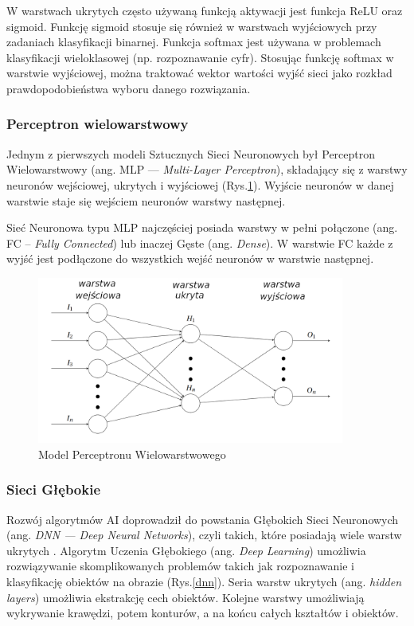 W warstwach ukrytych często używaną funkcją aktywacji jest funkcja ReLU oraz sigmoid. Funkcję sigmoid stosuje się również w warstwach wyjściowych przy zadaniach klasyfikacji binarnej. Funkcja softmax jest używana w problemach klasyfikacji wieloklasowej (np. rozpoznawanie cyfr). Stosując funkcję softmax w warstwie wyjściowej, można traktować wektor wartości wyjść sieci jako rozkład prawdopodobieństwa wyboru danego rozwiązania.

\subsubsection{Perceptron wielowarstwowy}
Jednym z pierwszych modeli Sztucznych Sieci Neuronowych był Perceptron
Wielowarstwowy (ang. MLP — \emph{Multi-Layer Perceptron}), składający 
się z warstwy neuronów wejściowej, ukrytych i wyjściowej (Rys.\ref{mlp}).
Wyjście neuronów w danej warstwie staje się wejściem neuronów warstwy następnej.

Sieć Neuronowa typu MLP najczęściej posiada warstwy w pełni połączone
(ang. FC -- \emph{Fully Connected}) lub inaczej Gęste (ang. \emph{Dense}). W warstwie FC każde z wyjść jest podłączone do wszystkich wejść neuronów w warstwie następnej.

\begin{figure}[h]
  \centering
  \includegraphics[width=0.9\textwidth]{img/mlp.png}
  \caption{Model Perceptronu Wielowarstwowego}
  \label{mlp}
\end{figure}


\subsubsection{Sieci Głębokie}

Rozwój algorytmów AI doprowadził do powstania Głębokich Sieci Neuronowych (ang. 
\emph{DNN — Deep Neural Networks}), czyli takich, które posiadają wiele 
warstw ukrytych \cite{Goodfellow-et-al-2016}. Algorytm Uczenia Głębokiego (ang. 
\emph{Deep Learning}) umożliwia rozwiązywanie skomplikowanych problemów takich 
jak rozpoznawanie i klasyfikację obiektów na obrazie (Rys.\ref{dnn}). Seria warstw ukrytych (ang. \emph{hidden layers}) umożliwia ekstrakcję cech obiektów. 
Kolejne warstwy umożliwiają wykrywanie krawędzi, potem konturów, a na końcu 
całych kształtów i obiektów.

